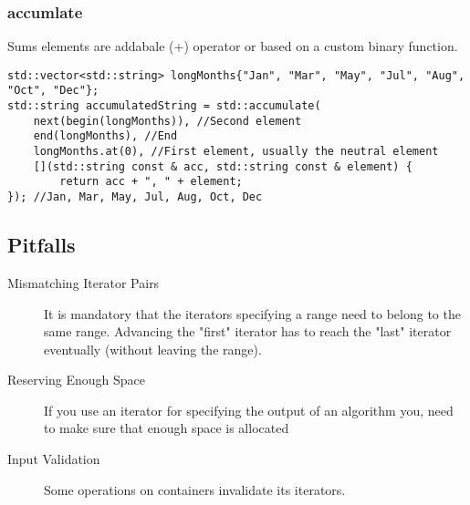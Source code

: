 \subsubsection{accumlate}
Sums elements are addabale (+) operator or based on a custom binary function.
\begin{lstlisting}
std::vector<std::string> longMonths{"Jan", "Mar", "May", "Jul", "Aug", "Oct", "Dec"}; 
std::string accumulatedString = std::accumulate(
	next(begin(longMonths)), //Second element 
	end(longMonths), //End 
	longMonths.at(0), //First element, usually the neutral element
	[](std::string const & acc, std::string const & element) {
		return acc + ", " + element;
}); //Jan, Mar, May, Jul, Aug, Oct, Dec
\end{lstlisting}


\subsection{Pitfalls}
\begin{description}
	\item [Mismatching Iterator Pairs]  It is mandatory that the iterators specifying a range need to belong to the same range. Advancing the "first" iterator has to reach the "last" iterator eventually (without leaving the range).
	\item [Reserving Enough Space] If you use an iterator for specifying the output of an algorithm you, need to make sure that enough space is allocated
	\item [Input Validation] Some operations on containers invalidate its iterators. 
\end{description}



\pagebreak